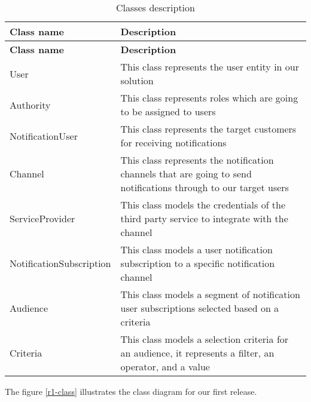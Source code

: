 \begin{longtable}{ | m{} | m{} | }
    \caption{Classes description}                                                                                                               \\
    \hline
    \textbf{Class name}      & \textbf{Description}                                                                                             \\
    \hline
    \endfirsthead
    \hline
    \textbf{Class name}      & \textbf{Description}                                                                                             \\
    \hline
    \endhead
    \endfoot
    \hline
    \endlastfoot
    User                     & This class represents the user entity in our solution                                                            \\
    \hline
    Authority                & This class represents roles which are going to be assigned to users                                              \\
    \hline
    NotificationUser         & This class represents the target customers for receiving notifications                                           \\
    \hline
    Channel                  & This class represents the notification channels that are going to send notifications through to our target users \\
    \hline
    ServiceProvider          & This class models the credentials of the third party service to integrate with the channel                       \\
    \hline
    NotificationSubscription & This class models a user notification subscription to a specific notification channel                            \\
    \hline
    Audience                 & This class models a segment of notification user subscriptions selected based on a criteria                      \\
    \hline
    Criteria                 & This class models a selection criteria for an audience, it represents a filter, an operator, and a value         \\
\end{longtable}


\noindent The figure \ref{r1-class} illustrates the class diagram for our first release. \\


